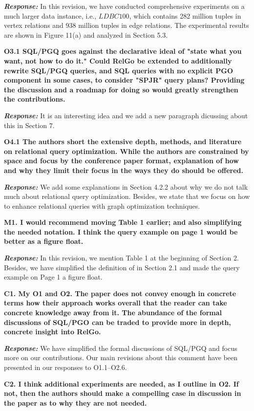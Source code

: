 \textbf{\textit{Response: }}
In this revision, we have conducted comprehensive experiments on a much larger data instance, i.e., $LDBC100$, which contains 282 million tuples in vertex relations and 938 million tuples in edge relations.
The experimental results are shown in Figure 11(a) and analyzed in Section 5.3.


\textbf{O3.1 SQL/PGQ goes against the declarative ideal of "state what you want, not how to do it."
Could RelGo be extended to additionally rewrite SQL/PGQ queries, and SQL queries with no explicit PGO component in some cases, to consider "SPJR" query plans?
Providing the discussion and a roadmap for doing so would greatly strengthen the contributions.}

\textbf{\textit{Response: }}
It is an interesting idea and we add a new paragraph dicussing about this in Section 7.

\textbf{O4.1 The authors short the extensive depth, methods, and literature on relational query optimization. While the authors are constrained by space and focus by the conference paper format, explanation of how and why they limit their focus in the ways they do should be offered. }

\textbf{\textit{Response: }}
We add some explanations in Section 4.2.2 about why we do not talk much about relational query optimization.
Besides, we state that we focus on how to enhance relational queries with graph optimization techniques.


\textbf{M1. I would recommend moving Table 1 earlier; and also simplifying the needed notation. I think the query example on page 1 would be better as a figure float. }

\textbf{\textit{Response: }}
In this revision, we mention Table 1 at the beginning of Section 2.
Besides, we have simplified the definition of \rgmapping in Section 2.1 and made the query example on Page 1 a figure float.


\textbf{
C1. My O1 and O2. The paper does not convey enough in concrete terms how their approach works overall that the reader can take concrete knowledge away from it. The abundance of the formal discussions of SQL/PGO can be traded to provide more in depth, concrete insight into RelGo.}

\textbf{\textit{Response: }}
We have simplified the formal discussions of SQL/PGQ and focus more on our contributions.
Our main revisions about this comment have been presented in our responses to O1.1--O2.6.


\textbf{
C2. I think additional experiments are needed, as I outline in O2. If not, then the authors should make a compelling case in discussion in the paper as to why they are not needed.}


